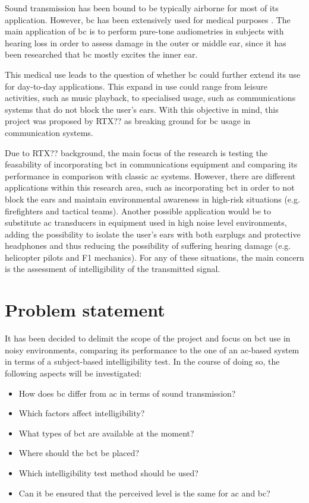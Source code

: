 Sound transmission has been bound to be typically airborne for most of its application. However, \gls{bc} has been extensively used for medical purposes \citep{iso_389-3}. The main application of \gls{bc} is to perform pure-tone audiometries in subjects with hearing loss in order to assess damage in the outer or middle ear, since it has been researched that \gls{bc} mostly excites the inner ear.

This medical use leads to the question of whether \gls{bc} could further extend its use for day-to-day applications. This expand in use could range from leisure activities, such as music playback, to specialised usage, such as communications systems that do not block the user's ears. With this objective in mind, this project was proposed by RTX?? as breaking ground for \gls{bc} usage in communication systems.

Due to RTX?? background, the main focus of the research is testing the feasability of incorporating \gls{bct} in communications equipment and comparing its performance in comparison with classic \gls{ac} systems. However, there are different applications within this research area, such as incorporating \gls{bct} in order to not block the ears and maintain environmental awareness in high-risk situations (e.g. firefighters and tactical teams). Another possible application would be to substitute \gls{ac} transducers in equipment used in high noise level environments, adding the possibility to isolate the user's ears with both earplugs and protective headphones and thus reducing the possibility of suffering hearing damage (e.g. helicopter pilots and F1 mechanics). For any of these situations, the main concern is the assessment of intelligibility of the transmitted signal.

\section{Problem statement}
It has been decided to delimit the scope of the project and focus on \gls{bct} use in noisy environments, comparing its performance to the one of an \gls{ac}-based system in terms of a subject-based intelligibility test. In the course of doing so, the following aspects will be investigated:
\begin{itemize}
\item How does \gls{bc} differ from \gls{ac} in terms of sound transmission?
\item Which factors affect intelligibility?
\item What types of \gls{bct} are available at the moment?
\item Where should the \gls{bct} be placed?
\item Which intelligibility test method should be used?
\item Can it be ensured that the perceived level is the same for \gls{ac} and \gls{bc}?
\end{itemize}